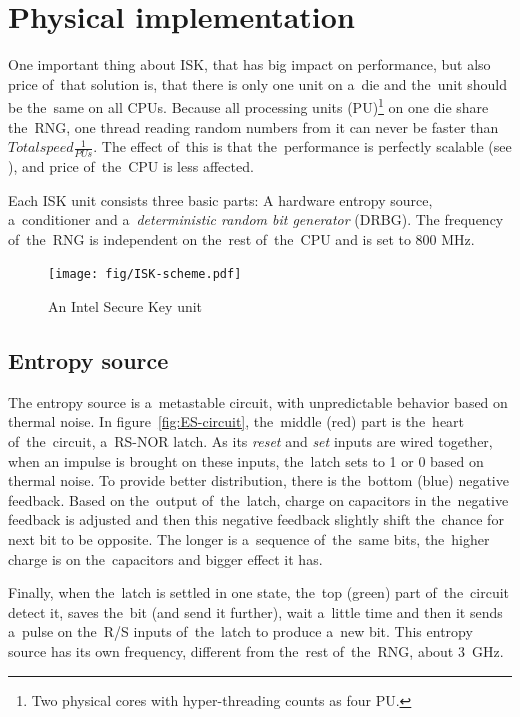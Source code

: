 \section{Physical implementation}\label{sec:ISK-physical}
One important thing about ISK, that has big impact on performance, but also price of~that solution is, that there is only one unit on a~die and the~unit should be the~same on all CPUs. %
Because all processing units (PU)\footnote{Two physical cores with hyper-threading counts as four PU.} on one die share the~RNG, one thread reading random numbers from it can never be faster than $Total speed  \frac{1}{PUs}$. The effect of~this is that the~performance is perfectly scalable (see ), and price of~the~CPU is less affected.

Each ISK unit consists three basic parts: A hardware entropy source, a~conditioner and a~{\em deterministic random bit generator} (DRBG)\cite{IntelDRNGGuide}. The frequency of~the~RNG is independent on the~rest of~the~CPU and is set to 800 MHz. 
\begin{figure}[h!]
  \centering
 \texttt{[image: fig/ISK-scheme.pdf]} %
\caption{An Intel Secure Key unit}
\label{fig:ISK-unit}
\end{figure}


\subsection{Entropy source}

The entropy source is a~metastable circuit, with unpredictable behavior based 
on thermal noise\cite{UnderstandingRdRandElectronic}. 
In figure~\ref{fig:ES-circuit}, the~middle (red) part is the~heart 
of~the~circuit, a~RS-NOR latch. As its {\em reset} and {\em set} inputs 
are wired together, when an impulse is brought on these inputs, the~latch sets 
to 1 or 0 based on thermal noise. To provide better distribution, there is 
the~bottom (blue) negative feedback. Based on the~output of~the~latch, charge 
on capacitors in the~negative feedback is adjusted and then this negative 
feedback slightly shift the~chance for next bit to be opposite. The longer 
is a~sequence of~the~same bits, the~higher charge is on the~capacitors 
and bigger effect it has.

Finally, when the~latch is settled in one state, the~top (green) part 
of~the~circuit detect it, saves the~bit (and send it further), wait 
a~little time and then it sends a~pulse on the~R/S inputs of~the~latch 
to produce a~new bit. This entropy source has its own frequency, different 
from the~rest of~the~RNG, about 3~GHz.

